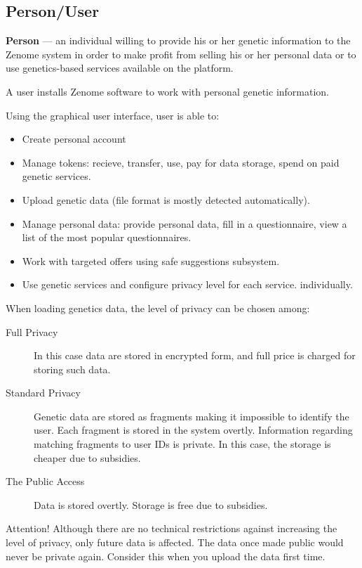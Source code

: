 \subsection{Person/User}
\textbf{Person} --- an individual willing to provide his or her genetic information to the Zenome system in order to make profit from selling his or her personal data or to use genetics-based services available on the platform.

A user installs Zenome software to work with personal genetic information.

Using the graphical user interface, user is able to:
\begin{itemize}
\item Create personal account
\item Manage tokens: recieve, transfer, use, pay for data storage, spend on paid genetic services.
\item Upload genetic data (file format is mostly detected automatically).
\item Manage personal data: provide personal data, fill in a questionnaire, view a list of the most popular questionnaires.
\item Work with targeted offers using safe suggestions subsystem.
\item Use genetic services and configure privacy level for each service. individually.
\end{itemize}

When loading genetics data, the level of privacy can be chosen among:
\begin{description}
\item [Full Privacy]
  In this case data are stored in encrypted form, and full price is charged for storing such data.

\item [Standard Privacy]
  Genetic data are stored as fragments making it impossible to identify the user. Each fragment is stored in the system overtly. Information regarding matching fragments to user IDs is private. In this case, the storage is cheaper due to subsidies.

\item [The Public Access]
  Data is stored overtly. Storage is free due to subsidies.
\end{description}

\begin{note}
  Attention! Although there are no technical restrictions against increasing the level of privacy, only future data is affected. The data once made public would never be private again. Consider this when you upload the data first time.
\end{note}



